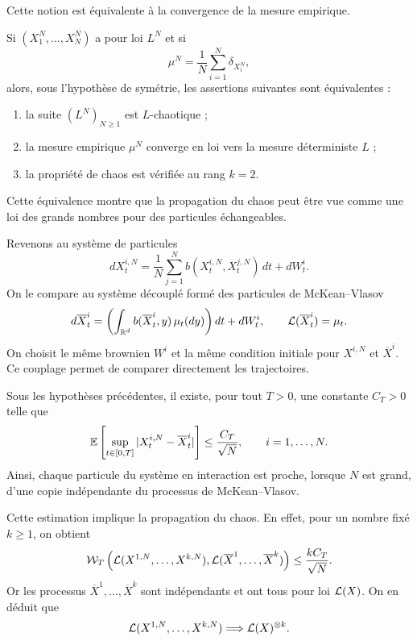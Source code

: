 Cette notion est équivalente à la convergence de la mesure empirique.

\begin{thm}{}{}
	Si $(X_1^N,\dots,X_N^N)$ a pour loi $L^N$ et si
	\[
		\mu^N
		=
		\frac1N
		\sum_{i=1}^{N}
		\delta_{X_i^N},
	\]
	alors, sous l'hypothèse de symétrie, les assertions suivantes sont équivalentes :
	\begin{enumerate}
		\item la suite $(L^N)_{N\geq1}$ est $L$-chaotique ;
		\item la mesure empirique $\mu^N$ converge en loi vers la mesure déterministe $L$ ;
		\item la propriété de chaos est vérifiée au rang $k=2$.
	\end{enumerate}
\end{thm}

Cette équivalence montre que la propagation du chaos peut être vue comme une loi des
grands nombres pour des particules échangeables.

Revenons au système de particules
\[
	dX_t^{i,N}
	=
	\frac1N
	\sum_{j=1}^{N}
	b(X_t^{i,N},X_t^{j,N})\,dt
	+
	dW_t^i.
\]
On le compare au système découplé formé des particules de McKean--Vlasov
\[
	d\overline X_t^i
	=
	\left(
	\int_{\mathbb{R}^d}
	b(\overline X_t^i,y)\,\mu_t(dy)
	\right)dt
	+
	dW_t^i,
	\qquad
	\mathcal{L}(\overline X_t^i)=\mu_t.
\]
On choisit le même brownien $W^i$ et la même condition initiale pour $X^{i,N}$ et
$\overline X^i$. Ce couplage permet de comparer directement les trajectoires.

Sous les hypothèses précédentes, il existe, pour tout $T>0$, une constante $C_T>0$ telle
que
\[
	\mathbb{E}\left[
	\sup_{t\in[0,T]}
	|X_t^{i,N}-\overline X_t^i|
	\right]
	\leq
	\frac{C_T}{\sqrt N},
	\qquad
	i=1,\dots,N.
\]
Ainsi, chaque particule du système en interaction est proche, lorsque $N$ est grand, d'une
copie indépendante du processus de McKean--Vlasov.

Cette estimation implique la propagation du chaos. En effet, pour un nombre fixé
$k\geq1$, on obtient
\[
	\mathcal{W}_T
	\left(
	\mathcal{L}(X^{1,N},\dots,X^{k,N}),
	\mathcal{L}(\overline X^1,\dots,\overline X^k)
	\right)
	\leq
	\frac{kC_T}{\sqrt N}.
\]
Or les processus $\overline X^1,\dots,\overline X^k$ sont indépendants et ont tous pour loi
$\mathcal{L}(X)$. On en déduit que
\[
	\mathcal{L}(X^{1,N},\dots,X^{k,N})
	\Longrightarrow
	\mathcal{L}(X)^{\otimes k}.
\]

